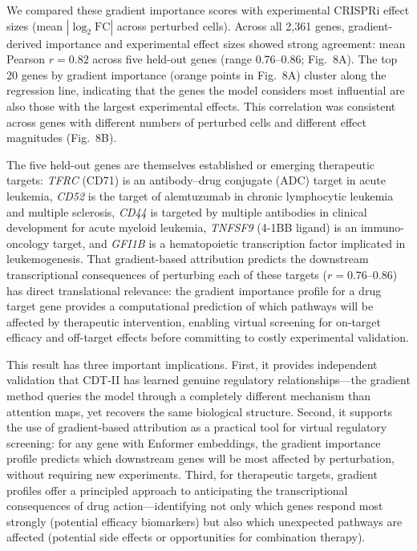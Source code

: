 \documentclass[12pt,a4paper]{article}
\begin{document}
We compared these gradient importance scores with experimental CRISPRi effect sizes (mean $|\log_2\text{FC}|$ across perturbed cells). Across all 2,361 genes, gradient-derived importance and experimental effect sizes showed strong agreement: mean Pearson $r = 0.82$ across five held-out genes (range 0.76--0.86; Fig.~8A). The top 20 genes by gradient importance (orange points in Fig.~8A) cluster along the regression line, indicating that the genes the model considers most influential are also those with the largest experimental effects. This correlation was consistent across genes with different numbers of perturbed cells and different effect magnitudes (Fig.~8B).

The five held-out genes are themselves established or emerging therapeutic targets: \textit{TFRC} (CD71) is an antibody--drug conjugate (ADC) target in acute leukemia, \textit{CD52} is the target of alemtuzumab in chronic lymphocytic leukemia and multiple sclerosis, \textit{CD44} is targeted by multiple antibodies in clinical development for acute myeloid leukemia, \textit{TNFSF9} (4-1BB ligand) is an immuno-oncology target, and \textit{GFI1B} is a hematopoietic transcription factor implicated in leukemogenesis. That gradient-based attribution predicts the downstream transcriptional consequences of perturbing each of these targets ($r = 0.76$--$0.86$) has direct translational relevance: the gradient importance profile for a drug target gene provides a computational prediction of which pathways will be affected by therapeutic intervention, enabling virtual screening for on-target efficacy and off-target effects before committing to costly experimental validation.

This result has three important implications. First, it provides independent validation that CDT-II has learned genuine regulatory relationships---the gradient method queries the model through a completely different mechanism than attention maps, yet recovers the same biological structure. Second, it supports the use of gradient-based attribution as a practical tool for virtual regulatory screening: for any gene with Enformer embeddings, the gradient importance profile predicts which downstream genes will be most affected by perturbation, without requiring new experiments. Third, for therapeutic targets, gradient profiles offer a principled approach to anticipating the transcriptional consequences of drug action---identifying not only which genes respond most strongly (potential efficacy biomarkers) but also which unexpected pathways are affected (potential side effects or opportunities for combination therapy).
\end{document}

